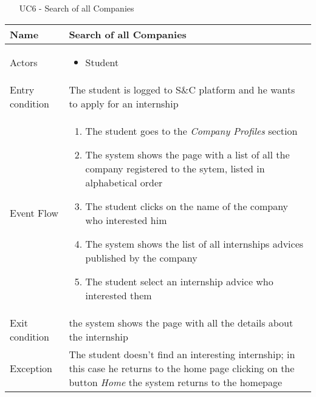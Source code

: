 				
				\begin{table} [H]
					\centering
					\begin{itemize}
						\item [UC6] - Search of all Companies
					\end{itemize}
					\begin{tabular}{|| P{7.5cm} | P{7.5cm} ||}
						\hline
						Name & Search of all Companies \\
						\hline
						Actors & \parbox{5cm}{\begin{itemize}
								\item Student
							\end{itemize}
						} \\
						\hline
						Entry condition & The student is logged to S\&C platform and he wants to apply for an internship \\
						\hline
						Event Flow & \parbox{5cm}{\begin{enumerate}
								\item The student goes to the \textit{Company
									Profiles} section
								\item The system shows the page with a 
								list of all the company registered to 
								the sytem, listed in alphabetical 
								order   
								\item The student clicks on the name of 
								the company who interested him
								\item The system shows the list of all 
								internships advices published by 
								the company 
								\item The student select an internship advice who 
								interested them
						\end{enumerate}} \\
						\hline 
						Exit condition &  the system shows the 
						page with all the details about the 
						internship \\
						\hline
						Exception & The student doesn’t find an interesting 
						internship; in this case he returns to the 
						home page clicking on the button \textit{Home}
						the system returns to the homepage 
						\\
						\hline
					\end{tabular}
				\end{table}
				
				
				
